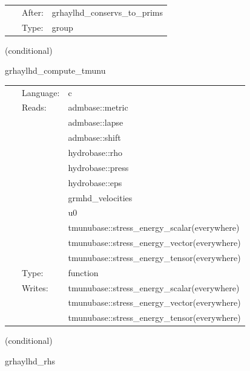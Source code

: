 \documentclass{article}
\begin{document}
\hspace{5mm}

 \begin{tabular*}{160mm}{cll} 
~ & After:  & grhaylhd\_conservs\_to\_prims \\ 
~ & Type:  & group \\ 
\end{tabular*} 


\vspace{5mm}

   (conditional) 

\hspace{5mm} grhaylhd\_compute\_tmunu 

\hspace{5mm}{\it compute stress-energy tensor } 


\hspace{5mm}

 \begin{tabular*}{160mm}{cll} 
~ & Language:  & c \\ 
~ & Reads:  & admbase::metric \\ 
~& ~ &admbase::lapse\\ 
~& ~ &admbase::shift\\ 
~& ~ &hydrobase::rho\\ 
~& ~ &hydrobase::press\\ 
~& ~ &hydrobase::eps\\ 
~& ~ &grmhd\_velocities\\ 
~& ~ &u0\\ 
~& ~ &tmunubase::stress\_energy\_scalar(everywhere)\\ 
~& ~ &tmunubase::stress\_energy\_vector(everywhere)\\ 
~& ~ &tmunubase::stress\_energy\_tensor(everywhere)\\ 
~ & Type:  & function \\ 
~ & Writes:  & tmunubase::stress\_energy\_scalar(everywhere) \\ 
~& ~ &tmunubase::stress\_energy\_vector(everywhere)\\ 
~& ~ &tmunubase::stress\_energy\_tensor(everywhere)\\ 
\end{tabular*} 


\vspace{5mm}

   (conditional) 

\hspace{5mm} grhaylhd\_rhs 
\end{document}

